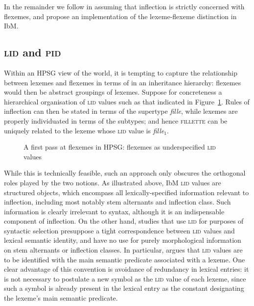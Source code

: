\documentclass[output=paper]{langsci/langscibook}
\begin{document}
In the remainder we follow \citet{Walther13} in assuming that inflection is strictly concerned with flexemes, and propose an implementation of the  lexeme-flexeme distinction in IbM.

\subsection{\textsc{lid} and \textsc{pid}}

Within an HPSG view of the world, it is tempting to capture the
relationship between lexemes and flexemes in terms of
 in an inheritance hierarchy: flexemes would then be
abstract groupings of lexemes. Suppose for concreteness a hierarchical
organisation of \textsc{lid} values such as that indicated in
Figure~\ref{fig:BonamiCrysmann:devoir}. Rules of inflection can then be stated in
terms of the supertype \emph{fille}, while lexemes are properly
individuated in terms of the subtypes; and hence \textsc{fillette} can
be uniquely related to the lexeme whose \textsc{lid} value is
\emph{fille$_1$}.

\begin{figure}[htb]
\centering
\smaller
\itshape
\begin{tree}
\end{tree}
\caption{\normalfont\label{fig:BonamiCrysmann:devoir} A first pass at flexemes in HPSG: flexemes as underspecified \textsc{lid} values}
\end{figure}


While this is technically feasible, such an approach only obscures the
orthogonal roles played by the two notions. As illustrated above, IbM
\textsc{lid} values are structured objects, which encompass all
lexically-specified information relevant to inflection, including most
notably stem alternants and inflection class. Such information is
clearly irrelevant to syntax, although it is an indispensable
component of inflection.  On the other hand, studies that use
\textsc{lid} for purposes of syntactic selection presuppose a tight
correspondence between \textsc{lid} values and lexical semantic
identity, and have no use for purely morphological information on stem
alternants or inflection classes. In particular, \citealt{Sag12}
argues that \textsc{lid} values are to be identified with the main semantic
predicate associated with a lexeme. One clear advantage of this
convention is avoidance of redundancy in lexical entries: it is not
necessary to postulate a new symbol as the \textsc{lid} value of each
lexeme, since such a symbol is already present in the lexical entry as
the constant designating the lexeme's main semantic predicate.
\end{document}
